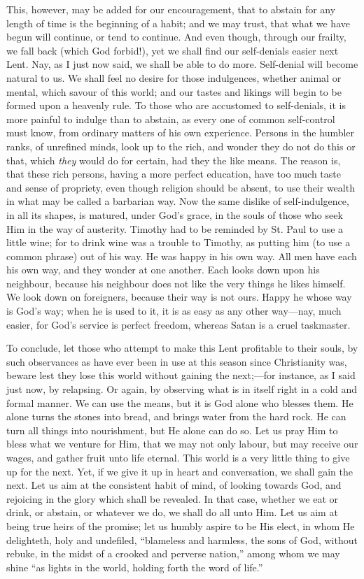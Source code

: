 This, however, may be added for our encouragement, that to abstain
for any length of time is the beginning of a habit; and we may trust,
that what we have begun will continue, or tend to continue. And even
though, through our frailty, we fall back (which God forbid!), yet we
shall find our self-denials easier next Lent. Nay, as I just now said,
we shall be able to do more. Self-denial will become natural to us. We
shall feel no desire for those indulgences, whether animal or mental,
which savour of this world; and our tastes and likings will begin to be
formed upon a heavenly rule. To those who are accustomed to
self-denials, it is more painful to indulge than to abstain, as every
one of common self-control must know, from ordinary matters of his own
experience. Persons in the humbler ranks, of unrefined minds, look up to
the rich, and wonder they do not do this or that, which \emph{they}
would do for certain, had they the like means. The reason is, that these
rich persons, having a more perfect education, have too much taste and
sense of propriety, even though religion should be absent, to use their
wealth in what may be called a barbarian way. Now the same dislike of
self-indulgence, in all its shapes, is matured, under God's grace, in
the souls of those who seek Him in the way of austerity. Timothy had to
be reminded by St. Paul to use a little wine; for to drink wine was a
trouble to Timothy, as putting him (to use a common phrase) out of his
way. He was happy in his own way. All men have each his own way, and
they wonder at one another. Each looks down upon his neighbour, because
his neighbour does not like the very things he likes himself. We look
down on foreigners, because their way is not ours. Happy he whose way is
God's way; when he is used to it, it is as easy as any other way—nay,
much easier, for God's service is perfect freedom, whereas Satan is a
cruel taskmaster.

To conclude, let those who attempt to make this Lent profitable to
their souls, by such observances as have ever been in use at this season
since Christianity was, beware lest they lose this world without gaining
the next;—for instance, as I said just now, by relapsing. Or again, by
observing what is in itself right in a cold and formal manner. We can
use the means, but it is God alone who blesses them. He alone turns the
stones into bread, and brings water from the hard rock. He can turn all
things into nourishment, but He alone can do so. Let us pray Him to
bless what we venture for Him, that we may not only labour, but may
receive our wages, and gather fruit unto life eternal. This world is a
very little thing to give up for the next. Yet, if we give it up in
heart and conversation, we shall gain the next. Let us aim at the
consistent habit of mind, of looking towards God, and rejoicing in the
glory which shall be revealed. In that case, whether we eat or drink, or
abstain, or whatever we do, we shall do all unto Him. Let us aim at
being true heirs of the promise; let us humbly aspire to be His elect,
in whom He delighteth, holy and undefiled, ``blameless and harmless,
the sons of God, without rebuke, in the midst of a crooked and perverse
nation,'' among whom we may shine ``as lights in the world,
holding forth the word of life.''

